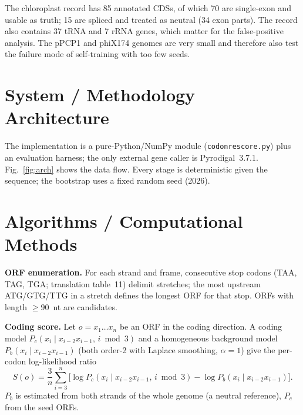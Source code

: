 \begin{table}[t]
\caption{Datasets. $^\dagger$Neutral = parts of multi-exon CDSs, pseudogenes and genes spanning the origin (three phiX174 genes); excluded from precision.}\label{tab:data}
\centering\footnotesize
\resizebox{\linewidth}{!}{}
\end{table}

The chloroplast record has 85 annotated CDSs, of which 70 are single-exon and usable as truth; 15 are spliced and treated as neutral (34 exon parts). The record also contains 37 tRNA and 7 rRNA genes, which matter for the false-positive analysis. The pPCP1 and phiX174 genomes are very small and therefore also test the failure mode of self-training with too few seeds.

\section{System / Methodology Architecture}
The implementation is a pure-Python/NumPy module (\texttt{codonrescore.py}) plus an evaluation harness; the only external gene caller is Pyrodigal~3.7.1. Fig.~\ref{fig:arch} shows the data flow. Every stage is deterministic given the sequence; the bootstrap uses a fixed random seed (2026).

\section{Algorithms / Computational Methods}
\textbf{ORF enumeration.} For each strand and frame, consecutive stop codons (TAA, TAG, TGA; translation table~11) delimit stretches; the most upstream ATG/GTG/TTG in a stretch defines the longest ORF for that stop. ORFs with length $\geq 90$~nt are candidates.

\textbf{Coding score.} Let $o=x_1\ldots x_n$ be an ORF in the coding direction. A coding model $P_c(x_i\mid x_{i-2}x_{i-1},\,i \bmod 3)$ and a homogeneous background model $P_b(x_i\mid x_{i-2}x_{i-1})$ (both order-2 with Laplace smoothing, $\alpha=1$) give the per-codon log-likelihood ratio
\begin{equation}
S(o)=\frac{3}{n}\sum_{i=3}^{n}\Big[\log P_c(x_i\mid x_{i-2}x_{i-1},\,i\bmod 3)-\log P_b(x_i\mid x_{i-2}x_{i-1})\Big].
\end{equation}
$P_b$ is estimated from both strands of the whole genome (a neutral reference), $P_c$ from the seed ORFs.

